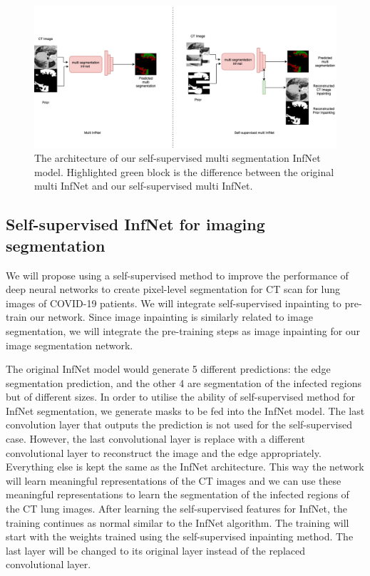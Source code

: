 \begin{figure}
	\centering
	\includegraphics[width=\linewidth]{self-super-multi-inf-net.png}
	\caption{The architecture of our self-supervised multi segmentation InfNet model. Highlighted green block is the difference between the original multi InfNet and our self-supervised multi InfNet.}
	\label{fig:multi-inf-net_arch}
\end{figure}



\subsection{Self-supervised InfNet for imaging segmentation}

We will propose using a self-supervised method to improve the performance of deep neural networks to create pixel-level segmentation for CT scan for lung images of COVID-19 patients. We will integrate self-supervised inpainting to pre-train our network. Since image inpainting is similarly related to image segmentation, we will integrate the pre-training steps as image inpainting for our image segmentation network. 

The original InfNet model would generate 5 different predictions: the edge segmentation prediction, and the other 4 are segmentation of the infected regions but of different sizes. In order to utilise the ability of self-supervised method for InfNet segmentation, we generate masks to be fed into the InfNet model. The last convolution layer that outputs the prediction is not used for the self-supervised case. However, the last convolutional layer is replace with a different convolutional layer to reconstruct the image and the edge appropriately. Everything else is kept the same as the InfNet architecture. This way the network will learn meaningful representations of the CT images and we can use these meaningful representations to learn the segmentation of the infected regions of the CT lung images. After learning the self-supervised features for InfNet, the training continues as normal similar to the InfNet algorithm. The training will start with the weights trained using the self-supervised inpainting method. The last layer will be changed to its original layer instead of the replaced convolutional layer. 

